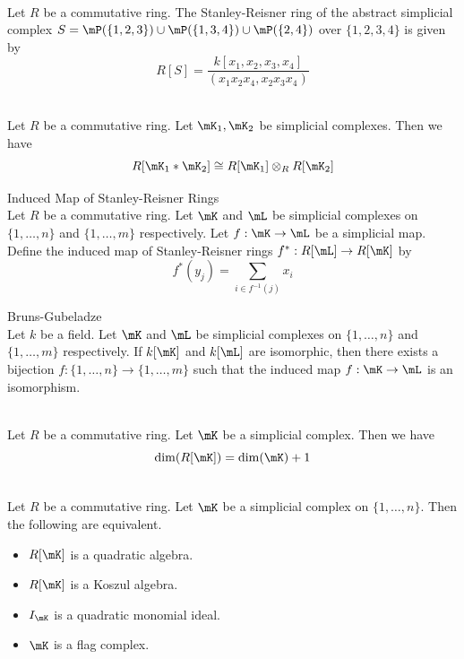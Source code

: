 \documentclass[a4paper]{article}
\begin{document}
\begin{eg}{}{}\\
Let $R$ be a commutative ring. The Stanley-Reisner ring of the abstract simplicial complex $S=\mP(\{1,2,3\})\cup\mP(\{1,3,4\})\cup\mP(\{2,4\})$ over $\{1,2,3,4\}$ is given by $$R[S]=\frac{k[x_1,x_2,x_3,x_4]}{(x_1x_2x_4,x_2x_3x_4)}$$
\end{eg}

\begin{prp}{}{}\\
Let $R$ be a commutative ring. Let $\mK_1,\mK_2$ be simplicial complexes. Then we have $$R[\mK_1\ast\mK_2]\cong R[\mK_1]\otimes_RR[\mK_2]$$
\end{prp}

\begin{defn}{Induced Map of Stanley-Reisner Rings}{}\\
Let $R$ be a commutative ring. Let $\mK$ and $\mL$ be simplicial complexes on $\{1,\dots,n\}$ and $\{1,\dots,m\}$ respectively. Let $f:\mK\to\mL$ be a simplicial map. Define the induced map of Stanley-Reisner rings $f^\ast:R[\mL]\to R[\mK]$ by $$f^\ast(y_j)=\sum_{i\in f^{-1}(j)}x_i$$
\end{defn}

\begin{thm}{Bruns-Gubeladze}{}\\
Let $k$ be a field. Let $\mK$ and $\mL$ be simplicial complexes on $\{1,\dots,n\}$ and $\{1,\dots,m\}$ respectively. If $k[\mK]$ and $k[\mL]$ are isomorphic, then there exists a bijection $f:\{1,\dots,n\}\to\{1,\dots,m\}$ such that the induced map $f:\mK\to\mL$ is an isomorphism. 
\end{thm}

\begin{prp}{}{}\\
Let $R$ be a commutative ring. Let $\mK$ be a simplicial complex. Then we have $$\dim(R[\mK])=\dim(\mK)+1$$
\end{prp}

\begin{prp}{}{}\\
Let $R$ be a commutative ring. Let $\mK$ be a simplicial complex on $\{1,\dots,n\}$. Then the following are equivalent. 
\begin{itemize}
\item $R[\mK]$ is a quadratic algebra. 
\item $R[\mK]$ is a Koszul algebra. 
\item $I_\mK$ is a quadratic monomial ideal. 
\item $\mK$ is a flag complex. 
\end{itemize}
\end{prp}
\end{document}
